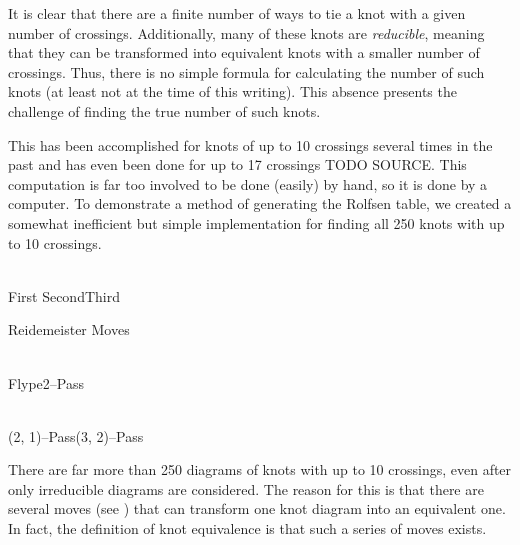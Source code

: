 \begin{paper}

It is clear that there are a finite number of ways to tie a knot with a given
number of crossings.
Additionally, many of these knots are \textit{reducible}, meaning that they can
be transformed into equivalent knots with a smaller number of crossings.
Thus, there is no simple formula for calculating the number of such knots (at
least not at the time of this writing).
This absence presents the challenge of finding the true number of such knots.

This has been accomplished for knots of up to 10 crossings several times in the
past and has even been done for up to 17 crossings TODO SOURCE.
This computation is far too involved to be done (easily) by hand, so it is done
by a computer.
To demonstrate a method of generating the Rolfsen table, we created a somewhat
inefficient but simple implementation for finding all 250 knots with up to 10
crossings.

\\

\hspace{-2ex}First \hspace{0.26\columnwidth}Second\hfill Third\hspace{2ex}\\
\vspace{-1em}
\begin{center}Reidemeister Moves\end{center}

\\

\hspace{2ex}Flype\hfill 2--Pass\hspace{6ex}

\\

(2, 1)--Pass\hfill(3, 2)--Pass\hspace{4ex}

\vspace{1em}

There are far more than 250 diagrams of knots with up to 10 crossings, even
after only irreducible diagrams are considered.
The reason for this is that there are several moves (see \figMoves) that can
transform one knot diagram into an equivalent one.
In fact, the definition of knot equivalence is that such a series of moves
exists.\\


\end{paper}
